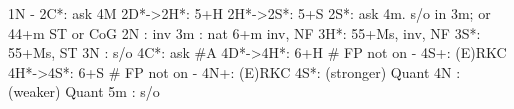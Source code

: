 1N -
2C*: ask 4M
2D*->2H*: 5+H
2H*->2S*: 5+S
2S*: ask 4m. s/o in 3m; or 44+m ST or CoG
2N : inv
3m : nat 6+m inv, NF 
3H*: 55+Ms, inv, NF 
3S*: 55+Ms, ST
3N : s/o
4C*: ask #A
4D*->4H*: 6+H  # FP not on
		- 4S+: (E)RKC 
4H*->4S*: 6+S  # FP not on
		- 4N+: (E)RKC
4S*: (stronger) Quant
4N : (weaker) Quant
5m : s/o
